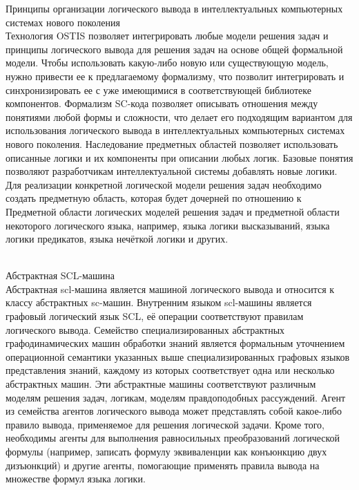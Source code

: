 \begin{frame}{\large Принципы организации логического вывода в интеллектуальных компьютерных системах нового поколения}
    \topline
    \vspace{30pt}
     \\
     
        Технология OSTIS позволяет интегрировать любые модели решения задач и принципы логического вывода для решения задач на основе общей формальной модели. Чтобы использовать какую-либо новую или существующую модель, нужно привести ее к предлагаемому формализму, что позволит интегрировать и синхронизировать ее с уже имеющимися в соответствующей библиотеке компонентов. Формализм SC-кода позволяет описывать отношения между понятиями любой формы и сложности, что делает его подходящим вариантом для использования логического вывода в интеллектуальных компьютерных системах нового поколения.
        Наследование предметных областей позволяет использовать описанные логики и их компоненты при описании любых логик. Базовые понятия позволяют разработчикам интеллектуальной системы добавлять новые логики. Для реализации конкретной логической модели решения задач необходимо создать предметную область, которая будет дочерней по отношению к Предметной области логических моделей решения задач и предметной области некоторого логического языка, например, языка логики высказываний, языка логики предикатов, языка нечёткой логики и других.
\end{frame}

\begin{frame}{\\Абстрактная SCL-машина}
\topline
\vspace{12mm}
 \\
 
Абстрактная scl-машина является машиной логического вывода и относится к классу абстрактных sc-машин. Внутренним языком scl-машины является графовый логический язык SCL, её операции соответствуют правилам логического вывода. Семейство специализированных абстрактных графодинамических машин обработки знаний является формальным уточнением операционной семантики указанных выше специализированных графовых языков представления знаний, каждому из которых соответствует одна или несколько абстрактных машин. Эти абстрактные машины соответствуют различным моделям решения задач, логикам, моделям правдоподобных рассуждений. Агент из семейства агентов логического вывода может представлять собой какое-либо правило вывода, применяемое для решения логической задачи. Кроме того, необходимы агенты для выполнения равносильных преобразований логической формулы (например, записать формулу эквиваленции как конъюнкцию двух дизъюнкций) и другие агенты, помогающие применять правила вывода на множестве формул языка логики.
\end{frame}

